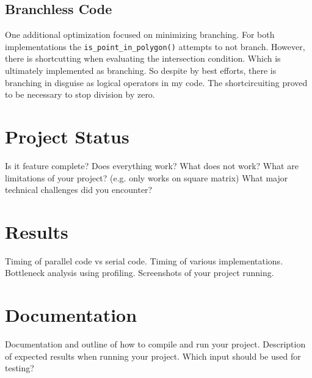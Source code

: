 \documentclass{article}
\begin{document}
\subsection{Branchless Code}
One additional optimization focused on minimizing branching. For both implementations the \texttt{is\_point\_in\_polygon()} attempts to not branch. However, there is shortcutting when evaluating the intersection condition. Which is ultimately implemented as branching. So despite by best efforts, there is branching in disguise as logical operators in my code. The shortcircuiting proved to be necessary to stop division by zero. 

\section{Project Status}
Is it feature complete? 
Does everything work? 
What does not work? 
What are limitations of your project? (e.g. only works on square matrix) 
What major technical challenges did you encounter?

\section{Results}
Timing of parallel code vs serial code. 
Timing of various implementations. 
Bottleneck analysis using profiling. 
Screenshots of your project running.

\section{Documentation}
Documentation and outline of how to compile and run your project. Description of expected results when running your project. Which input should be used for testing?
\end{document}
